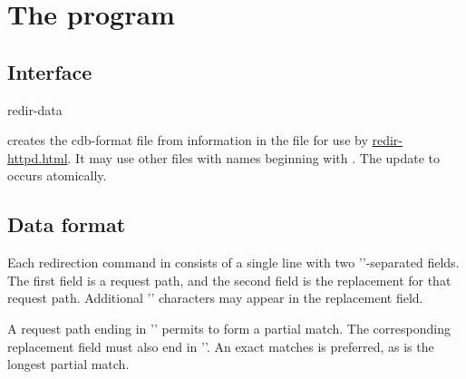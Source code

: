 
\chapter{The  program}

\section{Interface}
\begin{code}
  redir-data
\end{code}

 creates the cdb-format file  from information in
the file  for use by \href{\cmd{redir-httpd}}{redir-httpd.html}.  It
may use other files with names beginning with .  The update to
 occurs atomically.

\section{Data format}

Each redirection command in  consists of a single line with two
'\cmd{\#}'-separated fields.  The first field is a request path, and the second
field is the replacement for that request path.  Additional '\cmd{\#}'
characters may appear in the replacement field.

A request path ending in '\cmd{/}' permits  to form a partial
match.  The corresponding replacement field must also end in '\cmd{/}'.
An exact matches is preferred, as is the longest partial match.


